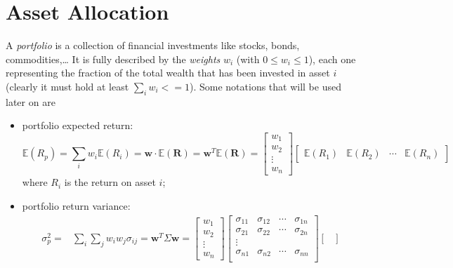 \chapter{Asset Allocation}
\label{portfolio-optimization}

A \emph{portfolio} is a collection of financial investments like stocks, bonds, commodities,\ldots
It is fully described by the \emph{weights} $w_i$ (with $0 \le w_i \le 1$), each one representing the fraction of the total wealth that has been invested in asset $i$ (clearly it must hold at least $\sum_i w_i <= 1$).
Some notations that will be used later on are

\begin{itemize}
	\tightlist
	\item
	portfolio expected return:
	\begin{equation}
		\mathbb{E}(R_{p}) = \sum _{i}w_{i} \mathbb{E}(R_{i}) = \mathbf{w}\cdot \mathbb{E}(\mathbf{R}) = \mathbf{w}^T \mathbb{E}(\mathbf{R})=
		\begin{bmatrix}
			w_1 \\
			w_2 \\
			\vdots \\
			w_n
		\end{bmatrix}
		\begin{bmatrix}
			\mathbb{E}(R_1) & \mathbb{E}(R_2) & \cdots & \mathbb{E}(R_n)
		\end{bmatrix}
	\end{equation}
	where $R_{i}$ is the return on asset $i$;
	\item
	portfolio return variance:
	\begin{equation}
		\begin{aligned}
			\sigma _{p}^{2} = &\sum _{i}\sum _{j}w_{i}w_{j}\sigma _{ij} = \mathbf{w}^T\Sigma\mathbf{w} =
			\begin{bmatrix}
				w_1 \\
				w_2 \\
				\vdots \\
				w_n
			\end{bmatrix}
			\begin{bmatrix}
				\sigma_{11} & \sigma_{12} & \cdots & \sigma_{1n} \\
				\sigma_{21} & \sigma_{22} & \cdots & \sigma_{2n} \\
				\vdots & & \\
				\sigma_{n1} & \sigma_{n2} & \cdots & \sigma_{nn} \\
			\end{bmatrix}
			\begin{bmatrix}

\end{bmatrix}
\end{aligned}
\end{equation}
\end{itemize}
